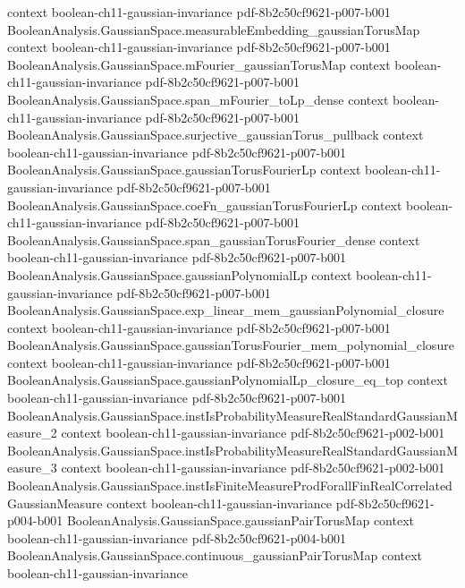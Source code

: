 \begin{lemma}
  {context}
  {boolean-ch11-gaussian-invariance}
  {pdf-8b2c50cf9621-p007-b001}
\proofstep
  {BooleanAnalysis.GaussianSpace.measurableEmbedding_gaussianTorusMap}
  {context}
  {boolean-ch11-gaussian-invariance}
  {pdf-8b2c50cf9621-p007-b001}
\proofstep
  {BooleanAnalysis.GaussianSpace.mFourier_gaussianTorusMap}
  {context}
  {boolean-ch11-gaussian-invariance}
  {pdf-8b2c50cf9621-p007-b001}
\proofstep
  {BooleanAnalysis.GaussianSpace.span_mFourier_toLp_dense}
  {context}
  {boolean-ch11-gaussian-invariance}
  {pdf-8b2c50cf9621-p007-b001}
\proofstep
  {BooleanAnalysis.GaussianSpace.surjective_gaussianTorus_pullback}
  {context}
  {boolean-ch11-gaussian-invariance}
  {pdf-8b2c50cf9621-p007-b001}
\proofstep
  {BooleanAnalysis.GaussianSpace.gaussianTorusFourierLp}
  {context}
  {boolean-ch11-gaussian-invariance}
  {pdf-8b2c50cf9621-p007-b001}
\proofstep
  {BooleanAnalysis.GaussianSpace.coeFn_gaussianTorusFourierLp}
  {context}
  {boolean-ch11-gaussian-invariance}
  {pdf-8b2c50cf9621-p007-b001}
\proofstep
  {BooleanAnalysis.GaussianSpace.span_gaussianTorusFourier_dense}
  {context}
  {boolean-ch11-gaussian-invariance}
  {pdf-8b2c50cf9621-p007-b001}
\proofstep
  {BooleanAnalysis.GaussianSpace.gaussianPolynomialLp}
  {context}
  {boolean-ch11-gaussian-invariance}
  {pdf-8b2c50cf9621-p007-b001}
\proofstep
  {BooleanAnalysis.GaussianSpace.exp_linear_mem_gaussianPolynomial_closure}
  {context}
  {boolean-ch11-gaussian-invariance}
  {pdf-8b2c50cf9621-p007-b001}
\proofstep
  {BooleanAnalysis.GaussianSpace.gaussianTorusFourier_mem_polynomial_closure}
  {context}
  {boolean-ch11-gaussian-invariance}
  {pdf-8b2c50cf9621-p007-b001}
\proofstep
  {BooleanAnalysis.GaussianSpace.gaussianPolynomialLp_closure_eq_top}
  {context}
  {boolean-ch11-gaussian-invariance}
  {pdf-8b2c50cf9621-p007-b001}
\proofstep
  {BooleanAnalysis.GaussianSpace.instIsProbabilityMeasureRealStandardGaussianMeasure_2}
  {context}
  {boolean-ch11-gaussian-invariance}
  {pdf-8b2c50cf9621-p002-b001}
\proofstep
  {BooleanAnalysis.GaussianSpace.instIsProbabilityMeasureRealStandardGaussianMeasure_3}
  {context}
  {boolean-ch11-gaussian-invariance}
  {pdf-8b2c50cf9621-p002-b001}
\proofstep
  {BooleanAnalysis.GaussianSpace.instIsFiniteMeasureProdForallFinRealCorrelatedGaussianMeasure}
  {context}
  {boolean-ch11-gaussian-invariance}
  {pdf-8b2c50cf9621-p004-b001}
\proofstep
  {BooleanAnalysis.GaussianSpace.gaussianPairTorusMap}
  {context}
  {boolean-ch11-gaussian-invariance}
  {pdf-8b2c50cf9621-p004-b001}
\proofstep
  {BooleanAnalysis.GaussianSpace.continuous_gaussianPairTorusMap}
  {context}
  {boolean-ch11-gaussian-invariance}

\end{lemma}
